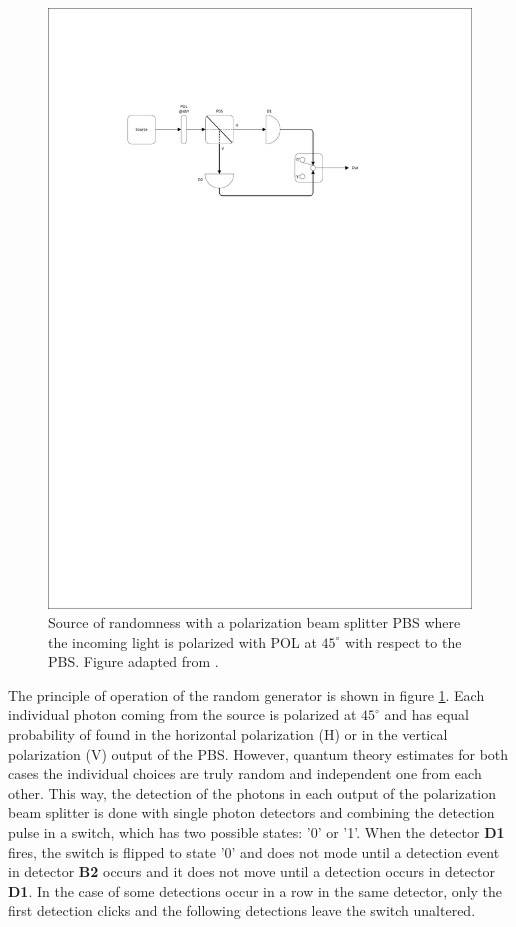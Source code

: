 \begin{figure}[H]
    \centering
        \includegraphics[clip, trim=3cm 20cm 5cm 5cm, width=1.00\textwidth]{./sdf/qrng/figures_raw/Random_Number_Generator.pdf}
    \caption{Source of randomness with a polarization beam splitter PBS where the incoming light is polarized with POL at $45^{\circ}$ with respect to the PBS. Figure adapted from \cite{Zeilinger}.}\label{qrng}
\end{figure}

The principle of operation of the random generator is shown in figure \ref{qrng}. Each individual photon coming from the source is polarized at $45^\circ$ and has equal probability of found in the horizontal polarization (H) or in the vertical polarization (V) output of the PBS. However, quantum theory estimates for both cases the individual choices are truly random and independent one from each other. This way, the detection of the photons in each output of the polarization beam splitter is done with single photon detectors and combining the detection pulse in a switch, which has two possible states: '0' or '1'. When the detector \textbf{D1} fires, the switch is flipped to state '0' and does not mode until a detection event in detector \textbf{B2} occurs and it does not move until a detection occurs in detector \textbf{D1}. In the case of some detections occur in a row in the same detector, only the first detection clicks and the following detections leave the switch unaltered.

